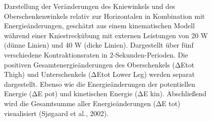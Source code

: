 \documentclass[
  letterpaper,
  DIV=11]{scrartcl}
\begin{document}
\begin{tcolorbox}[enhanced jigsaw, colback=white, bottomrule=.15mm, title=\textcolor{quarto-callout-note-color}{\faInfo}\hspace{0.5em}{Abbildung 4: Analyse der Kniestreckbewegung mit Darstellung von Winkel-
und Energieänderungen aus (Sjøgaard et al., 2002)}, toptitle=1mm, colbacktitle=quarto-callout-note-color!10!white, toprule=.15mm, rightrule=.15mm, arc=.35mm, leftrule=.75mm, left=2mm, breakable, bottomtitle=1mm, colframe=quarto-callout-note-color-frame, titlerule=0mm, opacityback=0, coltitle=black, opacitybacktitle=0.6]

\begin{figure}[H]


\caption{\label{fig-PInt_Sjogaard}Darstellung der Veränderungen des
Kniewinkels und des Oberschenkenwinkels relativ zur Horizontalen in
Kombination mit Energieänderungen, geschätzt aus einem kinematischen
Modell während einer Kniestreckübung mit externen Leistungen von 20 W
(dünne Linien) und 40 W (dicke Linien). Dargestellt über fünf
verschiedene Kontraktionsraten in 2-Sekunden-Perioden. Die positiven
Gesamtenergieänderungen des Oberschenkels (ΔEtot Thigh) und
Unterschenkels (ΔEtot Lower Leg) werden separat dargestellt. Ebenso wie
die Energieänderungen der potentiellen Energie (ΔE pot) und kinetischen
Energie (ΔE kin). Abschließend wird die Gesamtsumme aller
Energieänderungen (ΔE tot) visualisiert (Sjøgaard et al., 2002).}


\end{figure}
\end{tcolorbox}
\end{document}
